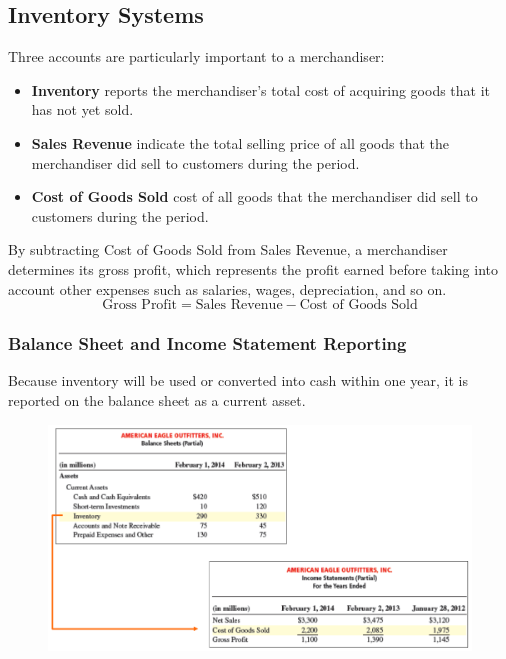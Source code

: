 \documentclass[../main.tex]{subfiles}
\begin{document}
	\subsection{Inventory Systems}
	Three accounts are particularly important to a merchandiser: 
	\begin{itemize}
		\item \textbf{Inventory} reports the merchandiser’s total cost of 
		acquiring goods that it has not yet sold.
		\item \textbf{Sales Revenue} indicate the total selling price of all 
		goods that the merchandiser did sell to customers during the period.
		\item \textbf{Cost of Goods Sold} cost of all goods that the 
		merchandiser did sell to customers during the period. 
	\end{itemize}

	By subtracting Cost of Goods Sold from Sales Revenue, a merchandiser 
	determines its gross profit, which represents the profit earned before 
	taking into account other expenses such as salaries, wages, depreciation, 
	and so on. 
	\[
	\text{Gross Profit} = \text{Sales Revenue} - \text{Cost of Goods Sold}
	\]
	
	\subsubsection{Balance Sheet and Income Statement Reporting}
	
	Because inventory will be used or converted into cash within one year, it 
	is reported on the balance sheet as a current asset.
	
	\begin{figure}[ht]
		\centering
		\includegraphics[width=1\columnwidth]{images/c7/inventory_reporting_eg.png}
	\end{figure}
	
\end{document}
